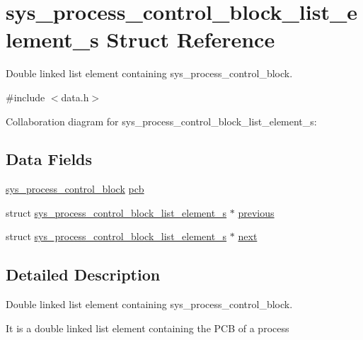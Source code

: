 \hypertarget{structsys__process__control__block__list__element__s}{}\section{sys\+\_\+process\+\_\+control\+\_\+block\+\_\+list\+\_\+element\+\_\+s Struct Reference}
\label{structsys__process__control__block__list__element__s}


Double linked list element containing sys\+\_\+process\+\_\+control\+\_\+block.  




{\ttfamily \#include $<$data.\+h$>$}



Collaboration diagram for sys\+\_\+process\+\_\+control\+\_\+block\+\_\+list\+\_\+element\+\_\+s\+:
\subsection*{Data Fields}
\begin{DoxyCompactItemize}
\item 
\hyperlink{data_8h_a4a97a9fe481ab1cef2c0bb4c799431d0}{sys\+\_\+process\+\_\+control\+\_\+block} \hyperlink{structsys__process__control__block__list__element__s_a31a8928210b29e097924862367ae70a7}{pcb}
\item 
struct \hyperlink{structsys__process__control__block__list__element__s}{sys\+\_\+process\+\_\+control\+\_\+block\+\_\+list\+\_\+element\+\_\+s} $\ast$ \hyperlink{structsys__process__control__block__list__element__s_a91a80f7180ef47545efc44c1f94d5fb7}{previous}
\item 
struct \hyperlink{structsys__process__control__block__list__element__s}{sys\+\_\+process\+\_\+control\+\_\+block\+\_\+list\+\_\+element\+\_\+s} $\ast$ \hyperlink{structsys__process__control__block__list__element__s_a1f16ad20706b2be26e3ed97088b6d2f2}{next}
\end{DoxyCompactItemize}


\subsection{Detailed Description}
Double linked list element containing sys\+\_\+process\+\_\+control\+\_\+block. 

It is a double linked list element containing the P\+C\+B of a process 


